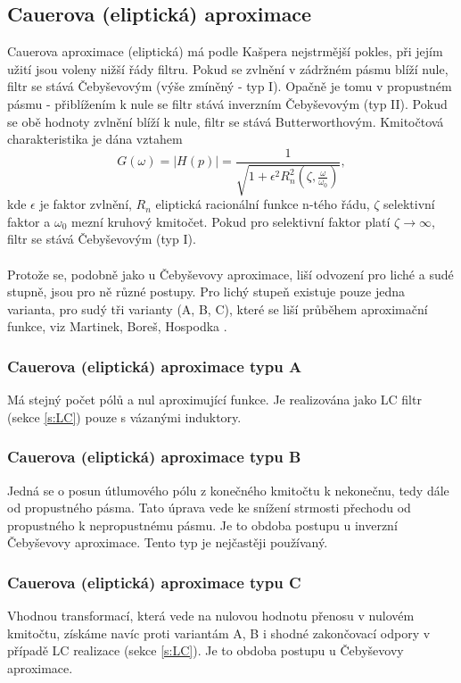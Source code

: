 \subsection{Cauerova (eliptická) aproximace}
\noindent Cauerova aproximace (eliptická) má podle Kašpera \cite{7} nejstrmější pokles, při jejím užití jsou voleny nižší řády filtru. Pokud se zvlnění v zádržném pásmu blíží nule, filtr se stává Čebyševovým (výše zmíněný - typ I). Opačně je tomu v propustném pásmu - přiblížením k nule se filtr stává inverzním Čebyševovým (typ II).  Pokud se obě hodnoty zvlnění blíží k nule, filtr se stává Butterworthovým. Kmitočtová charakteristika je dána vztahem
\begin{equation}
G(\omega) = |H(p)| = \frac{1}{\sqrt{1 + \epsilon ^2 R_n ^2(\zeta, \frac{\omega}{\omega _0})}},
\end{equation}
kde $\epsilon$ je faktor zvlnění, $R_n$ eliptická racionální funkce n-tého řádu, $\zeta$ selektivní faktor a $\omega _0$ mezní kruhový kmitočet. Pokud pro selektivní faktor platí $\zeta \rightarrow \infty$, filtr se stává Čebyševovým (typ I).\\
\\
Protože se, podobně jako u Čebyševovy aproximace, liší odvození pro liché a sudé stupně, jsou pro ně různé postupy. Pro lichý stupeň existuje pouze jedna varianta, pro sudý tři varianty (A, B, C), které se liší průběhem aproximační funkce, viz Martinek, Boreš, Hospodka \cite{10}.
\subsubsection{Cauerova (eliptická) aproximace typu A}
Má stejný počet pólů a nul aproximující funkce. Je realizována jako LC filtr (sekce \ref{s:LC}) pouze s vázanými induktory.
\subsubsection{Cauerova (eliptická) aproximace typu B}
Jedná se o posun útlumového pólu z konečného kmitočtu k nekonečnu, tedy dále od propustného pásma. Tato úprava vede ke snížení strmosti přechodu od propustného k nepropustnému pásmu. Je to obdoba postupu u inverzní Čebyševovy aproximace. Tento typ je nejčastěji používaný.
\subsubsection{Cauerova (eliptická) aproximace typu C}
Vhodnou transformací, která vede na nulovou hodnotu přenosu v nulovém kmitočtu, získáme navíc proti variantám A, B i shodné zakončovací odpory v případě LC realizace (sekce \ref{s:LC}). Je to obdoba postupu u Čebyševovy aproximace.
